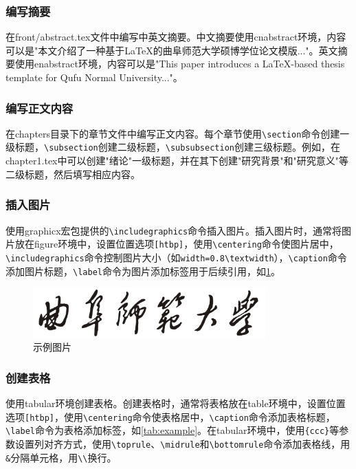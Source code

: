 \subsubsection{编写摘要}
在front/abstract.tex文件中编写中英文摘要。中文摘要使用cnabstract环境，内容可以是"本文介绍了一种基于LaTeX的曲阜师范大学硕博学位论文模版..."。英文摘要使用enabstract环境，内容可以是"This paper introduces a LaTeX-based thesis template for Qufu Normal University..."。

\subsubsection{编写正文内容}
在chapters目录下的章节文件中编写正文内容。每个章节使用\verb|\section|命令创建一级标题，\verb|\subsection|创建二级标题，\verb|\subsubsection|创建三级标题。例如，在chapter1.tex中可以创建"绪论"一级标题，并在其下创建"研究背景"和"研究意义"等二级标题，然后填写相应内容。

\subsubsection{插入图片}
使用graphicx宏包提供的\verb|\includegraphics|命令插入图片。插入图片时，通常将图片放在figure环境中，设置位置选项\verb|[htbp]|，使用\verb|\centering|命令使图片居中，\verb|\includegraphics|命令控制图片大小（如\verb|width=0.8\textwidth|），\verb|\caption|命令添加图片标题，\verb|\label|命令为图片添加标签用于后续引用，如\ref{fig:example}。

\begin{figure}[htbp]
    \centering
    \includegraphics[width=0.8\textwidth]{figure/logo/logo-1.png}
    \caption{示例图片}
    \label{fig:example}
\end{figure}

\subsubsection{创建表格}
使用tabular环境创建表格。创建表格时，通常将表格放在table环境中，设置位置选项\verb|[htbp]|，使用\verb|\centering|命令使表格居中，\verb|\caption|命令添加表格标题，\verb|\label|命令为表格添加标签，如\ref{tab:example}。在tabular环境中，使用\verb|{ccc}|等参数设置列对齐方式，使用\verb|\toprule|、\verb|\midrule|和\verb|\bottomrule|命令添加表格线，用\verb|&|分隔单元格，用\verb|\\|换行。

